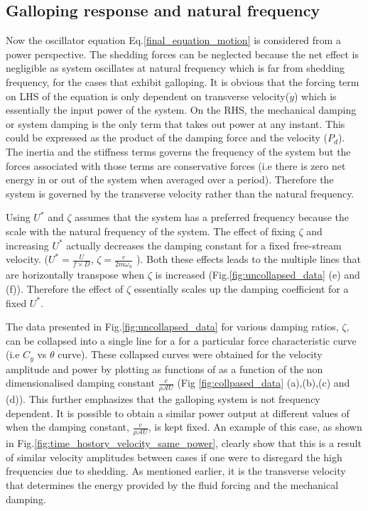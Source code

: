 
 \subsection{Galloping response and natural frequency}
 
 Now the oscillator equation Eq.\eqref{final_equation_motion} is considered from a power perspective. The shedding forces can be neglected because the net effect is negligible as system oscillates at natural frequency which is far from shedding frequency, for the cases that exhibit galloping. It is obvious that the forcing term on LHS of the equation is only dependent on transverse velocity($\dot{y}$) which is essentially the input power of the system. On the RHS, the mechanical damping or system damping is the only term that takes out power at any instant. This could be expressed as the product of the damping force and the velocity ($P_d$). The inertia and the stiffness terms governs the frequency of the system but the forces associated with those terms are conservative forces (i.e there is zero net energy in or out of the system when averaged over a period). Therefore the system is governed by the transverse velocity rather than the natural frequency.
 

 Using $U^*$ and $\zeta$ assumes that the system has a preferred frequency because the scale with the natural frequency of the system. The effect of fixing $\zeta$ and increasing $U^*$ actually decreases the damping constant for a fixed free-stream velocity. ($U^*=\frac{U}{f \times D}$, $\zeta= \frac{c}{2 m \omega_n}$ ). Both these effects leads to the multiple lines that are horizontally transpose when $\zeta$ is increased (Fig.\ref{fig:uncollapsed_data} (e) and (f)). Therefore the effect of $\zeta$ essentially scales up the damping coefficient for a fixed $U^*$.
 
 The data presented in Fig.\ref{fig:uncollapsed_data} for various damping ratios, $\zeta$, can be collapsed into a single line for a for a particular force characteristic curve (i.e $C_y$ vs $\theta$ curve). These collapsed curves were  obtained for the velocity amplitude  and power by plotting as functions of as a function of  the non dimensionalised  damping constant $\frac{c}{\rho\mathcal{A}U}$ 
(Fig \ref{fig:collpased_data} (a),(b),(c) and (d)).  This further emphasizes that the galloping system is not frequency dependent. It is possible to obtain a similar power output at different values of \ustar when the damping constant, $\frac{c}{\rho\mathcal{A}U}$, is kept fixed. An example of this case, as shown in Fig.\ref{fig:time_hostory_velocity_same_power}, clearly show that this is a result of similar velocity amplitudes between cases if one were to disregard the high frequencies due to shedding. As mentioned earlier, it is the transverse velocity that determines the energy provided by the fluid forcing and the mechanical damping.

